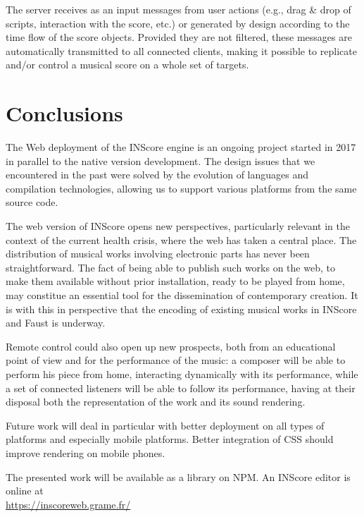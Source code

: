 \documentclass{article}
\begin{document}
The server receives as an input messages from user actions (e.g., drag \& drop of scripts, interaction with the score, etc.) or generated by design according to the time flow of the score objects. Provided they are not filtered, these messages are automatically transmitted to all connected clients, making it possible to replicate and/or control a musical score on a whole set of targets.


\section{Conclusions}

The Web deployment of the INScore engine is an ongoing project started in 2017 in parallel to the native version development. The design issues that we encountered in the past were solved by the evolution of languages and compilation technologies, allowing us to support various platforms from the same source code.

The web version of INScore opens new perspectives, particularly relevant in the context of the current health crisis, where the web has taken a central place. 
The distribution of musical works involving electronic parts has never been straightforward. The fact of being able to publish such works on the web, to make them available without prior installation, ready to be played from home, may constitue an essential tool for the dissemination of contemporary creation. It is with this in perspective that the encoding of existing musical works in INScore and Faust is underway.

Remote control could also open up new prospects, both from an educational point of view and for the performance of the music: a composer will be able to perform his piece from home, interacting dynamically with its performance, while a set of connected listeners will be able to follow its performance, having at their disposal both the representation of the work and its sound rendering.

Future work will deal in particular with better deployment on all types of platforms and especially mobile platforms. Better integration of CSS should improve rendering on mobile phones.

The presented work will be available as a library on NPM. An INScore editor is online at \\
\hspace*{15mm} {\small \url{https://inscoreweb.grame.fr/}}



\balance

\end{document}
